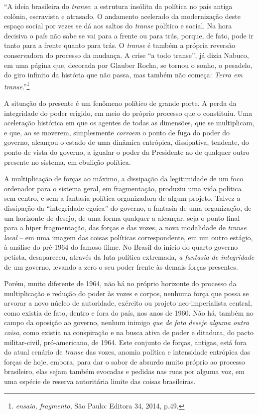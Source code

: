 ``A ideia brasileira do \emph{transe}: a estrutura insólita da política
no país antiga colônia, escravista e atrasado. O andamento acelerado da
modernização deste espaço social por vezes se dá aos saltos do
\emph{transe} político e social. Na hora decisiva o país não sabe se vai
para a frente ou para trás, porque, de fato, pode ir tanto para a frente
quanto para trás. O \emph{transe} é também a própria reversão
conservadora do processo da mudança. A crise ``a todo transe'', já dizia
Nabuco, em uma página que, decorada por Glauber Rocha, se tornou o
sonho, o pesadelo, do giro infinito da história que não passa, mas
também não começa: \emph{Terra em transe}.''\footnote{\emph{ensaio,
  fragmento,} São Paulo: Editora 34, 2014, p.49.}

A situação do presente é um fenômeno político de grande porte. A perda
da integridade do poder erigido, em meio do próprio processo que o
constituiu. Uma aceleração histórica em que os agentes de todas as
dimensões, que se multiplicam, e que, ao se moverem, simplesmente
\emph{corroem} o ponto de fuga do poder do governo, alcançou o estado de
uma dinâmica entrópica, dissipativa, tendente, do ponto de vista do
governo, a igualar o poder da Presidente ao de qualquer outro presente
no sistema, em ebulição política.

A multiplicação de forças ao máximo, a dissipação da legitimidade de um
foco ordenador para o sistema geral, em fragmentação, produziu uma vida
política sem centro, e sem a fantasia política organizadora de algum
projeto. Talvez a dissipação da ``integridade egoica'' do governo, a
fantasia de uma organização, de um horizonte de desejo, de uma forma
qualquer a alcançar, seja o ponto final para a hiper fragmentação, das
forças e das vozes, a nova modalidade de \emph{transe local} -- em uma
imagem das coisas políticas correspondente, em um outro estágio, à
análise do pré-1964 do famoso filme. No Brasil do início do quarto
governo petista, desapareceu, através da luta política extremada,
\emph{a fantasia de integridade} de um governo, levando a zero o seu
poder frente às demais forças presentes.

Porém, muito diferente de 1964, não há no próprio horizonte do processo
da multiplicação e redução do poder às vozes e corpos, nenhuma força que
possa se arvorar a novo núcleo de autoridade, exército ou projeto
neo-imperialista central, como existia de fato, dentro e fora do país,
nos anos de 1960. Não há, também no campo da oposição ao governo, nenhum
inimigo \emph{que de fato deseje alguma outra coisa}, como existia na
conspiração e na busca ativa de poder e ditadura, do pacto
militar-civil, pró-americano, de 1964. Este conjunto de forças, antigas,
está fora do atual cenário de \emph{transe} das vozes, anomia política e
intensidade entrópica das forças de hoje, embora, para dar o sabor de
absurdo muito próprio ao processo brasileiro, elas sejam também evocadas
e pedidas nas ruas por alguma voz, em uma espécie de reserva autoritária
limite das coisas brasileiras.


